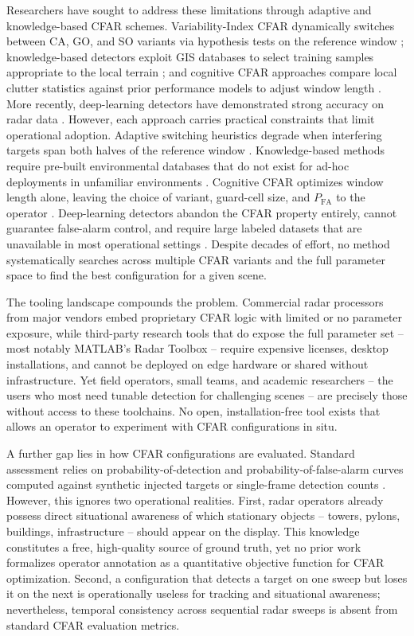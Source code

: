 \documentclass[conf]{new-aiaa}
\begin{document}
Researchers have sought to address these limitations through adaptive and knowledge-based CFAR schemes. Variability-Index CFAR dynamically switches between CA, GO, and SO variants via hypothesis tests on the reference window \cite{vicfar2014}; knowledge-based detectors exploit GIS databases to select training samples appropriate to the local terrain \cite{farina2008kb}; and cognitive CFAR approaches compare local clutter statistics against prior performance models to adjust window length \cite{humphreys2022}. More recently, deep-learning detectors have demonstrated strong accuracy on radar data \cite{salalstm2023}. However, each approach carries practical constraints that limit operational adoption. Adaptive switching heuristics degrade when interfering targets span both halves of the reference window \cite{vicfar2014}. Knowledge-based methods require pre-built environmental databases that do not exist for ad-hoc deployments in unfamiliar environments \cite{farina2008kb}. Cognitive CFAR optimizes window length alone, leaving the choice of variant, guard-cell size, and $P_{\mathrm{FA}}$ to the operator \cite{humphreys2022}. Deep-learning detectors abandon the CFAR property entirely, cannot guarantee false-alarm control, and require large labeled datasets that are unavailable in most operational settings \cite{cfarnet2024}. Despite decades of effort, no method systematically searches across multiple CFAR variants and the full parameter space to find the best configuration for a given scene.

The tooling landscape compounds the problem. Commercial radar processors from major vendors embed proprietary CFAR logic with limited or no parameter exposure, while third-party research tools that do expose the full parameter set -- most notably MATLAB's Radar Toolbox \cite{mathworksCFAR} -- require expensive licenses, desktop installations, and cannot be deployed on edge hardware or shared without infrastructure. Yet field operators, small teams, and academic researchers -- the users who most need tunable detection for challenging scenes -- are precisely those without access to these toolchains. No open, installation-free tool exists that allows an operator to experiment with CFAR configurations in situ.

A further gap lies in how CFAR configurations are evaluated. Standard assessment relies on probability-of-detection and probability-of-false-alarm curves computed against synthetic injected targets or single-frame detection counts \cite{richards2005, skolnik2008}. However, this ignores two operational realities. First, radar operators already possess direct situational awareness of which stationary objects -- towers, pylons, buildings, infrastructure -- should appear on the display. This knowledge constitutes a free, high-quality source of ground truth, yet no prior work formalizes operator annotation as a quantitative objective function for CFAR optimization. Second, a configuration that detects a target on one sweep but loses it on the next is operationally useless for tracking and situational awareness; nevertheless, temporal consistency across sequential radar sweeps is absent from standard CFAR evaluation metrics.
\end{document}
